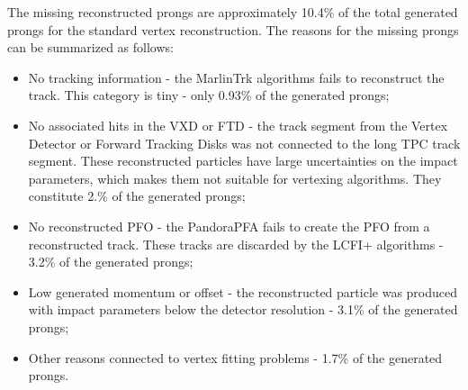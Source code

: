 The missing reconstructed prongs are approximately 10.4\% of the total generated prongs for the standard vertex reconstruction. 
The reasons for the missing prongs can be summarized as follows:
\begin{itemize}
\item No tracking information - the MarlinTrk algorithms fails to reconstruct the track. This category is tiny - only 0.93\% of the generated prongs;
\item No associated hits in the VXD or FTD - the track segment from the Vertex Detector or Forward Tracking Disks was not connected to the long TPC track segment. These reconstructed particles have large uncertainties on the impact parameters, which makes them not suitable for vertexing algorithms. They constitute 2.\% of the generated prongs;
\item No reconstructed PFO - the PandoraPFA fails to create the PFO from a reconstructed track. These tracks are discarded by the LCFI+ algorithms - 3.2\%  of the generated prongs;
\item Low generated momentum or offset  - the reconstructed particle was produced with impact parameters below the detector resolution - 3.1\%  of the generated prongs;
\item Other reasons connected to vertex fitting problems - 1.7\% of the generated prongs.
\end{itemize}



